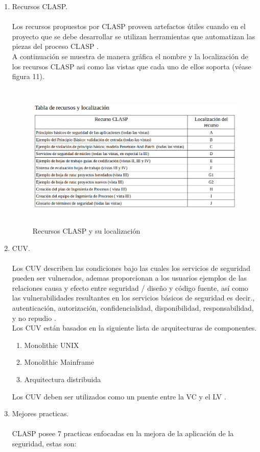 \documentclass[runningheads,a4paper]{llncs}
\begin{document}
\begin{enumerate}
	\item Recursos \gls{CLASP}.\\\\ 
	Los recursos propuestos por \gls{CLASP} proveen artefactos útiles cuando en el proyecto que se debe 			desarrollar se utilizan herramientas que automatizan las piezas del proceso \gls{CLASP} \cite{CLASPConcepts}.\\
	
	  A continuación se muestra de manera gráfica el nombre y la localización de los recursos \gls{CLASP} asi como las vistas que cada uno de ellos soporta (véase figura 11).\\
	  
\begin{figure}
\centering
\includegraphics[height=7.0cm, width=12.0cm]{sa_figura_11}
\caption{Recursos \gls{CLASP} y su localización}
\label{fig:example}
\end{figure}
	 
	\item \gls{CUV}.\\\\
	Los \gls{CUV} describen las condiciones bajo las cuales los servicios de seguridad pueden ser vulnerados, 	ademas proporcionan a los usuarios ejemplos de las relaciones causa y efecto entre seguridad / diseño y 		código fuente, así como las vulnerabilidades resultantes en los servicios básicos de seguridad es decir., 	autenticación, autorización, confidencialidad, disponibilidad, responsabilidad, y no repudio \cite{CLASPConcepts}.\\
	
	Los \gls{CUV} están basados en la siguiente lista de arquitecturas de componentes.\\
	
\begin{enumerate}
	\item Monolithic \gls{UNIX}
	\item Monolithic Mainframe
	\item Arquitectura distribuida 
	\\
\end{enumerate}
Los \gls{CUV} deben ser utilizados como un puente entre la \gls{VC} y el \gls{LV} \cite{CLASPConcepts}.
\\	
	\item Mejores practicas.\\\\
	\gls{CLASP} posee 7 practicas enfocadas en la mejora de la aplicación de la seguridad, estas son:\\


\end{enumerate}
\end{document}
